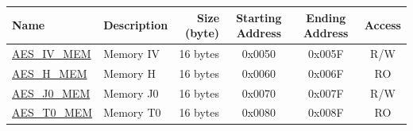\begin{longtable}{ |p{3cm} | p{3cm} | r | c | c | c |  }
\hline
\rowcolor{lightgray}
\textbf{Name} & \textbf{Description}  &  \textbf{Size (byte)}  &  \textbf{Starting Address}  &  \textbf{Ending Address}  & \textbf{Access}   \\ \hline
{\hyperref[memdesc:AESIVMEM]{AES\_IV\_MEM}} & Memory IV & 16 bytes  & 0x0050 & 0x005F & R/W \\ \hline
{\hyperref[memdesc:AESHMEM]{AES\_H\_MEM}}  & Memory H  & 16 bytes  & 0x0060 & 0x006F & RO  \\ \hline
{\hyperref[memdesc:AESJ0MEM]{AES\_J0\_MEM}} & Memory J0 & 16 bytes  & 0x0070 & 0x007F & R/W \\ \hline
{\hyperref[memdesc:AEST0MEM]{AES\_T0\_MEM}} & Memory T0 & 16 bytes  & 0x0080 & 0x008F & RO  \\ \hline
\end{longtable}
